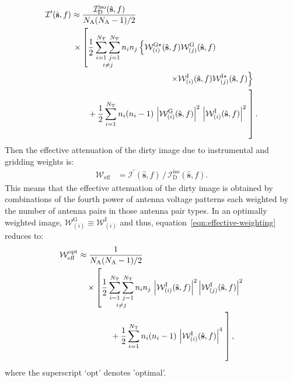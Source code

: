 \documentclass[a4paper,fleqn,usenatbib]{mnras}
\newcommand{\Nant}{N_\textrm{A}}
\begin{document}
\begin{align}\label{eqn:wt-dirty-image-EPIC-decomp-approx2}
  \mathcal{I}^\prime(\hat{\mathbf{s}},f) &\approx \frac{\mathcal{I}_\textrm{D}^\textrm{iso}(\hat{\mathbf{s}},f)}{\Nant(\Nant-1)/2} \nonumber\\
  &\,\times \left[\frac{1}{2}\mathop{\sum_{i=1}^{N_\textrm{T}}\sum_{j=1}^{N_\textrm{T}}}_{i\ne j}n_in_j\left\{\mathcal{W}^{\textrm{G}\star}_{(i)}(\hat{\mathbf{s}},f)\mathcal{W}^\textrm{G}_{(j)}(\hat{\mathbf{s}},f)\right.\right.\nonumber\\
  &\qquad\qquad\qquad\qquad\qquad\qquad \left. \times \mathcal{W}^\textrm{I}_{(i)}(\hat{\mathbf{s}},f)\mathcal{W}^{\textrm{I}\star}_{(j)}(\hat{\mathbf{s}},f)\right\} \nonumber\\ 
  &\qquad + \frac{1}{2}\sum_{i=1}^{N_\textrm{T}}n_i(n_i-1)\,\left|\mathcal{W}^\textrm{G}_{(i)}(\hat{\mathbf{s}},f)\right|^2\,\left|\mathcal{W}^\textrm{I}_{(i)}(\hat{\mathbf{s}},f)\right|^2\left.\vphantom{\sum_{\substack{ab\\a\ne b\\a\in i, b\in j}}}\right].
\end{align}
Then the effective attenuation of the dirty image due to instrumental and gridding weights is:
\begin{align}\label{eqn:effective-weighting}
  \mathcal{W}_\textrm{eff} &= \mathcal{I}^\prime(\hat{\mathbf{s}},f)\, / \,\mathcal{I}_\textrm{D}^\textrm{iso}(\hat{\mathbf{s}},f).
\end{align}
This means that the effective attenuation of the dirty image is obtained by combinations of the fourth power of antenna voltage patterns each weighted by the number of antenna pairs in those antenna pair types. In an optimally weighted image, $\mathcal{W}^\textrm{G}_{(i)} \equiv \mathcal{W}^\textrm{I}_{(i)}$ and thus, equation~\ref{eqn:effective-weighting} reduces to:
\begin{align}\label{eqn:effective-weighting-optimal}
  \mathcal{W}_\textrm{eff}^\textrm{opt} &\approx \frac{1}{\Nant(\Nant-1)/2} \nonumber\\
  &\quad \times \left[\frac{1}{2}\mathop{\sum_{i=1}^{N_\textrm{T}}\sum_{j=1}^{N_\textrm{T}}}_{i\ne j}n_in_j\,\left|\mathcal{W}^\textrm{I}_{(i)}(\hat{\mathbf{s}},f)\right|^2\left|\mathcal{W}^\textrm{I}_{(j)}(\hat{\mathbf{s}},f)\right|^2\right.\nonumber\\
  &\qquad\qquad + \frac{1}{2}\sum_{i=1}^{N_\textrm{T}}n_i(n_i-1)\,\left|\mathcal{W}^\textrm{I}_{(i)}(\hat{\mathbf{s}},f)\right|^4\left.\vphantom{\sum_{\substack{ab\\a\ne b\\a\in i, b\in j}}}\right],
\end{align}
where the superscript `$\textrm{opt}$' denotes 'optimal'.
\end{document}
